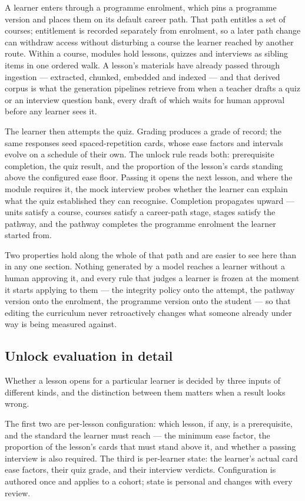 A learner enters through a programme enrolment, which pins a programme version and places them on its default career path. That path entitles a set of courses; entitlement is recorded separately from enrolment, so a later path change can withdraw access without disturbing a course the learner reached by another route. Within a course, modules hold lessons, quizzes and interviews as sibling items in one ordered walk. A lesson's materials have already passed through ingestion --- extracted, chunked, embedded and indexed --- and that derived corpus is what the generation pipelines retrieve from when a teacher drafts a quiz or an interview question bank, every draft of which waits for human approval before any learner sees it.

The learner then attempts the quiz. Grading produces a grade of record; the same responses seed spaced-repetition cards, whose ease factors and intervals evolve on a schedule of their own. The unlock rule reads both: prerequisite completion, the quiz result, and the proportion of the lesson's cards standing above the configured ease floor. Passing it opens the next lesson, and where the module requires it, the mock interview probes whether the learner can explain what the quiz established they can recognise. Completion propagates upward --- units satisfy a course, courses satisfy a career-path stage, stages satisfy the pathway, and the pathway completes the programme enrolment the learner started from.

Two properties hold along the whole of that path and are easier to see here than in any one section. Nothing generated by a model reaches a learner without a human approving it, and every rule that judges a learner is frozen at the moment it starts applying to them --- the integrity policy onto the attempt, the pathway version onto the enrolment, the programme version onto the student --- so that editing the curriculum never retroactively changes what someone already under way is being measured against.

\subsection{Unlock evaluation in detail}

Whether a lesson opens for a particular learner is decided by three inputs of different kinds, and the distinction between them matters when a result looks wrong.

The first two are per-lesson configuration: which lesson, if any, is a prerequisite, and the standard the learner must reach --- the minimum ease factor, the proportion of the lesson's cards that must stand above it, and whether a passing interview is also required. The third is per-learner state: the learner's actual card ease factors, their quiz grade, and their interview verdicts. Configuration is authored once and applies to a cohort; state is personal and changes with every review.

